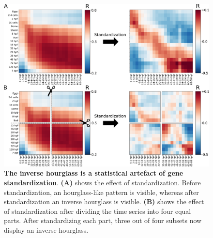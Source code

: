 \begin{figure}[H]
    \includegraphics[width=\linewidth]{ch.hourglass/images/normalisation.png}
    \caption{\textbf{The inverse hourglass is a statistical artefact of gene standardization}. \textbf{(A)} shows the effect of standardization. Before standardization, an hourglass-like pattern is visible, whereas after standardization an inverse hourglass is visible. \textbf{(B)} shows the effect of standardization after dividing the time series into four equal parts. After standardizing each part, three out of four subsets now display an inverse hourglass. }
    \label{fig:standardization}
\end{figure}

